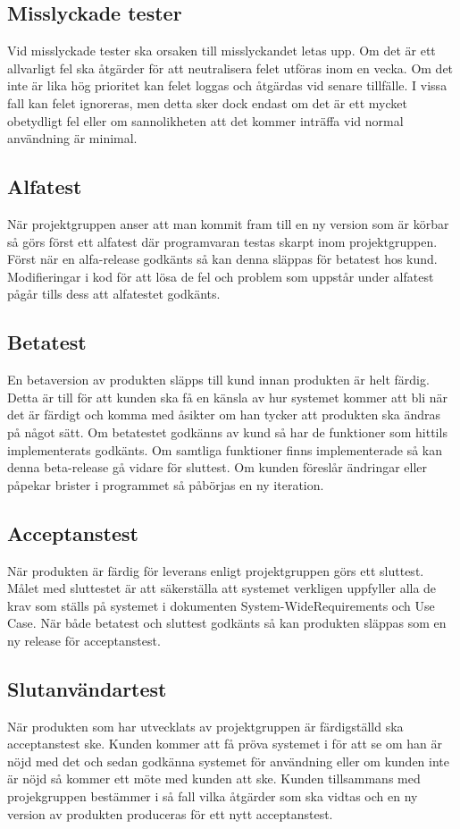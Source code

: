 \subsection{Misslyckade tester}
Vid misslyckade tester ska orsaken till misslyckandet letas upp. Om det är ett allvarligt fel ska åtgärder för att neutralisera felet utföras inom en vecka. Om det inte är lika hög prioritet kan felet loggas och åtgärdas vid senare tillfälle. I vissa fall kan felet ignoreras, men detta sker dock endast om det är ett mycket obetydligt fel eller om sannolikheten att det kommer inträffa vid normal användning är minimal.

\subsection{Alfatest}
När projektgruppen anser att man kommit fram till en ny version som är körbar så görs först ett alfatest där programvaran testas skarpt inom projektgruppen. Först när en alfa-release godkänts så kan denna släppas för betatest hos kund. Modifieringar i kod för att lösa de fel och problem som uppstår under alfatest pågår tills dess att alfatestet godkänts.

\subsection{Betatest}
En betaversion av produkten släpps till kund innan produkten är helt färdig. Detta är till för att kunden ska få en känsla av hur systemet kommer att bli när det är färdigt och komma med åsikter om han tycker att produkten ska ändras på något sätt. Om betatestet godkänns av kund så har de funktioner som hittils implementerats godkänts. Om samtliga funktioner finns implementerade så kan denna beta-release gå vidare för sluttest. Om kunden föreslår ändringar eller påpekar brister i programmet så påbörjas en ny iteration.

\subsection{Acceptanstest}
När produkten är färdig för leverans enligt projektgruppen görs ett sluttest. Målet med sluttestet är att säkerställa att systemet verkligen uppfyller alla de krav som ställs på systemet i dokumenten System-WideRequirements och Use Case. När både betatest och sluttest godkänts så kan produkten släppas som en ny release för acceptanstest.

\subsection{Slutanvändartest}
När produkten som har utvecklats av projektgruppen är färdigställd ska acceptanstest ske. Kunden kommer att få pröva systemet i för att se om han är nöjd med det och sedan godkänna systemet för användning eller om kunden inte är nöjd så kommer ett möte med kunden att ske. Kunden tillsammans med projekgruppen bestämmer i så fall vilka åtgärder som ska vidtas och en ny version av produkten produceras för ett nytt acceptanstest.

